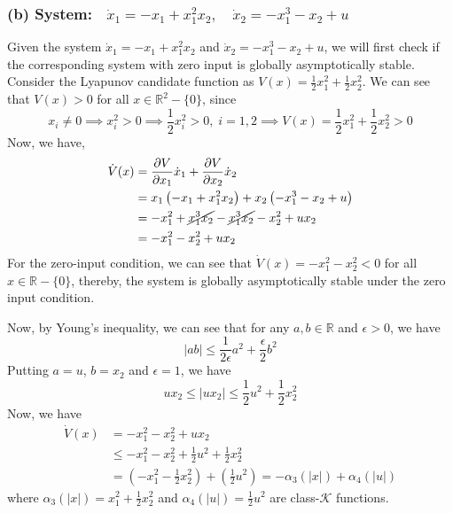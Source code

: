 \subsubsection*{(b) System:\( \quad \dot{x}_{1}=-x_{1}+x_{1}^{2} x_{2}, \quad \dot{x}_{2}=-x_{1}^{3}-x_{2}+u \)}

Given the system \( \dot{x}_{1}=-x_{1}+x_{1}^{2} x_{2} \) and \( \dot{x}_{2}=-x_{1}^{3}-x_{2}+u \), we will first check if the corresponding system with zero input is globally asymptotically stable.
Consider the Lyapunov candidate function as \( V(x)=\frac{1}{2} x_{1}^{2}+\frac{1}{2} x_{2}^{2} \).
We can see that \( V(x) > 0 \) for all \( x \in \mathbb{R}^2 - \{ 0 \} \), since
\begin{equation*}
    x_i \neq 0
    \implies
    x_i^2 > 0
    \implies
    \frac{1}{2} x_i^2 > 0,
    \;
    i = 1, 2
    \implies
    V(x)
    =
    \frac{1}{2} x_1^2 + \frac{1}{2} x_2^2
    > 0
\end{equation*}
Now, we have,
\begin{align*}
    \dot{V}(x)
     & =
    \frac{\partial V}{\partial x_1} \dot{x}_1 + \frac{\partial V}{\partial x_2} \dot{x}_2
    \\
     & =
    x_1 \left( -x_1 + x_1^2 x_2 \right) + x_2 \left( -x_1^3 - x_2 + u \right)
    \\
     & =
    -x_1^2 + \cancel{x_1^3 x_2} - \cancel{x_1^3 x_2} - x_2^2 + u x_2
    \\
     & =
    -x_1^2 - x_2^2 + u x_2
\end{align*}
For the zero-input condition, we can see that \( \dot{V}(x) = -x_1^2 - x_2^2 < 0 \) for all \( x \in \mathbb{R} - \{ 0 \} \), thereby, the system is globally asymptotically stable under the zero input condition.

Now, by Young's inequality, we can see that for any \( a, b \in \mathbb{R} \) and \( \epsilon > 0 \), we have
\begin{equation*}
    \left| a b \right|
    \leq
    \frac{1}{2 \epsilon} a^2 + \frac{\epsilon}{2} b^2
\end{equation*}
Putting \( a = u \), \( b = x_2 \) and \( \epsilon = 1 \), we have
\begin{equation*}
    u x_2 \leq \left| u x_2 \right|
    \leq
    \frac{1}{2} u^2 + \frac{1}{2} x_2^2
\end{equation*}
Now, we have
\begin{align*}
    \dot{V}(x)
     & =
    -x_1^2 - x_2^2 + u x_2
    \\ & \leq
    -x_1^2 - x_2^2 + \frac{1}{2} u^2 + \frac{1}{2} x_2^2
    \\ & =
    \left( -x_1^2 - \frac{1}{2} x_2^2 \right) + \left( \frac{1}{2} u^2 \right)
    =
    - \alpha_3(|x|) + \alpha_4(|u|)
\end{align*}
where \( \alpha_3(|x|) = x_1^2 + \frac{1}{2} x_2^2 \) and \( \alpha_4(|u|) = \frac{1}{2} u^2 \) are class-\( \mathcal{K} \) functions.

